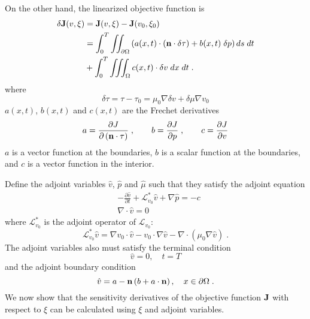 On the other hand, the linearized objective function is
\begin{equation} \label{linear_obj} \begin{split}
   \delta {\bf J}(v,\xi) &= {\bf J}(v,\xi) - {\bf J}(v_0,\xi_0) \\
 &= \int_0^T \iint_{\partial\Omega}
    \left(a(x,t) \cdot ({\bf n} \cdot \delta \tau)
   + b(x,t)\; \delta p \right) ds\; dt \\
 &+ \int_0^T \iiint_\Omega c(x,t) \cdot \delta v\; dx\; dt \;.
\end{split} \end{equation}
where
\[ \delta\tau = \tau - \tau_0 = \mu_0 \nabla \delta v + \delta\mu \nabla v_0 \]
$a(x,t)$, $b(x,t)$ and $c(x,t)$ are the Frechet derivatives
\[ a = \frac{\partial J}{\partial\, ({\bf n} \cdot \tau)} \;, \qquad
   b = \frac{\partial J}{\partial p}\;, \qquad
   c = \frac{\partial J}{\partial v}\]
$a$ is a vector function at the boundaries, $b$ is a scalar function
at the boundaries, and $c$ is a vector function in the interior.

Define the adjoint variables $\hat v$, $\hat p$ and $\hat \mu$ such that they
satisfy the adjoint equation
\begin{equation} \begin{split} \label{adjoint}
    & - \frac{\partial {\hat v}}{\partial t} + \mathcal{L}_{v_0}^* {\hat v}
      + \nabla {\hat p} = -c \\
    & \nabla \cdot {\hat v} = 0
\end{split} \end{equation}
where ${\mathcal L}_{v_0}^*$ is the adjoint operator of ${\mathcal L}_{v_0}$:
\[ {\mathcal L}_{v_0}^* \hat{v} = \nabla v_0 \cdot {\hat v}
        - v_0 \cdot \nabla {\hat v} - \nabla \cdot (\mu_0 \nabla {\hat v}) \;.\]
The adjoint variables also must satisfy the terminal condition
\[ {\hat v} = 0, \quad t = T \]
and the adjoint boundary condition
\begin{equation} \label{nsadjbc}
   {\hat v} = a - {\bf n} \left(b + a \cdot {\bf n} \right),
   \quad x \in \partial\Omega \;.
\end{equation}
We now show that the sensitivity derivatives of the objective function $\bf J$
with respect to $\xi$ can be calculated using $\xi$ and adjoint variables.

